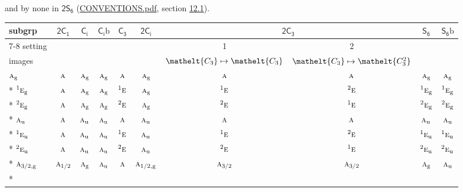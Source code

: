 \documentclass[10pt,a4paper]{article}
\numberwithin{equation}{section}
\newcommand{\eltfont}[1]{{\let\sigma\eltsigma\mathelt{#1}}}
\newcommand{\grp}[1]{\mathsf{#1}}
\newcommand{\irr}[1]{\text{\normalfont\scshape #1}}
\newcommand{\conjpair}[1]{{}^{#1}}
\newcommand{\cls}[1]{\eltfont{#1}}
\newcommand{\ptag}[1]{\mathrm{#1}}
\newcommand{\secondclass}{\mathrm{b}}
\begin{document}
and by none in $\grp{2S_{6}}$ (\href{../../CONVENTIONS.pdf}{CONVENTIONS.pdf}, section \href{../../../rotation/CONVENTIONS.pdf\#conv.12.1}{12.1}).
{\small\begin{longtable}{@{}lccccccccc@{}}\toprule
subgrp & \href{2C1.pdf}{$\grp{2C_{1}}$} & \href{S2.pdf}{$\grp{C_{i}}$} & \href{S2b.pdf}{$\grp{C_{i}}\secondclass$} & \href{C3.pdf}{$\grp{C_{3}}$} & \href{2S2.pdf}{$\grp{2C_{i}}$} & \multicolumn{2}{c}{\href{2C3.pdf}{$\grp{2C_{3}}$}} & \href{S6.pdf}{$\grp{S_{6}}$} & \href{S6b.pdf}{$\grp{S_{6}}\secondclass$}\\\cmidrule(lr){7-8}
setting &  &  &  &  &  & 1 & 2 &  & \\
images &  &  &  &  &  & {\scriptsize $\cls{C_{3}} \mapsto \cls{C_{3}}$} & {\scriptsize $\cls{C_{3}} \mapsto \cls{C_{3}^{2}}$} &  & \\\midrule\endhead
\bottomrule\endfoot\endlastfoot
$\irr{a}_{\ptag{g}}$ & $\irr{a}$ & $\irr{a}_{\ptag{g}}$ & $\irr{a}_{\ptag{g}}$ & $\irr{a}$ & $\irr{a}_{\ptag{g}}$ & $\irr{a}$ & $\irr{a}$ & $\irr{a}_{\ptag{g}}$ & $\irr{a}_{\ptag{g}}$\\*
$\conjpair{1}\irr{e}_{\ptag{g}}$ & $\irr{a}$ & $\irr{a}_{\ptag{g}}$ & $\irr{a}_{\ptag{g}}$ & $\conjpair{1}\irr{e}$ & $\irr{a}_{\ptag{g}}$ & $\conjpair{1}\irr{e}$ & $\conjpair{2}\irr{e}$ & $\conjpair{1}\irr{e}_{\ptag{g}}$ & $\conjpair{1}\irr{e}_{\ptag{g}}$\\*
$\conjpair{2}\irr{e}_{\ptag{g}}$ & $\irr{a}$ & $\irr{a}_{\ptag{g}}$ & $\irr{a}_{\ptag{g}}$ & $\conjpair{2}\irr{e}$ & $\irr{a}_{\ptag{g}}$ & $\conjpair{2}\irr{e}$ & $\conjpair{1}\irr{e}$ & $\conjpair{2}\irr{e}_{\ptag{g}}$ & $\conjpair{2}\irr{e}_{\ptag{g}}$\\*
$\irr{a}_{\ptag{u}}$ & $\irr{a}$ & $\irr{a}_{\ptag{u}}$ & $\irr{a}_{\ptag{u}}$ & $\irr{a}$ & $\irr{a}_{\ptag{u}}$ & $\irr{a}$ & $\irr{a}$ & $\irr{a}_{\ptag{u}}$ & $\irr{a}_{\ptag{u}}$\\*
$\conjpair{1}\irr{e}_{\ptag{u}}$ & $\irr{a}$ & $\irr{a}_{\ptag{u}}$ & $\irr{a}_{\ptag{u}}$ & $\conjpair{1}\irr{e}$ & $\irr{a}_{\ptag{u}}$ & $\conjpair{1}\irr{e}$ & $\conjpair{2}\irr{e}$ & $\conjpair{1}\irr{e}_{\ptag{u}}$ & $\conjpair{1}\irr{e}_{\ptag{u}}$\\*
$\conjpair{2}\irr{e}_{\ptag{u}}$ & $\irr{a}$ & $\irr{a}_{\ptag{u}}$ & $\irr{a}_{\ptag{u}}$ & $\conjpair{2}\irr{e}$ & $\irr{a}_{\ptag{u}}$ & $\conjpair{2}\irr{e}$ & $\conjpair{1}\irr{e}$ & $\conjpair{2}\irr{e}_{\ptag{u}}$ & $\conjpair{2}\irr{e}_{\ptag{u}}$\\*
$\irr{a}_{3/2,\ptag{g}}$ & $\irr{a}_{1/2}$ & $\irr{a}_{\ptag{g}}$ & $\irr{a}_{\ptag{u}}$ & $\irr{a}$ & $\irr{a}_{1/2,\ptag{g}}$ & $\irr{a}_{3/2}$ & $\irr{a}_{3/2}$ & $\irr{a}_{\ptag{g}}$ & $\irr{a}_{\ptag{u}}$\\*

\end{longtable}}
\end{document}
